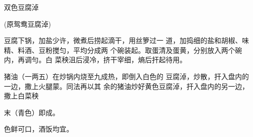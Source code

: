 \begin{recipe}{双色豆腐淖}

(原鸳鸯豆腐淖)

\ingredients


\cooking

\step 	豆腐下锅，加盐少许，微煮后捞起滴干，用丝箩过一 道，加捣细的盐和胡椒、味精、料酒、豆粉搅匀，平均分成两 个碗装起。取蛋清及蛋黄，分别放入两个碗内，再调勻。白 菜秧沮后浸冷，挤干宰细，熵后扞起待用。

\step 	猪油（一两五）在炒锅内烧至九成热，即倒入白色的 豆腐淖，炒散，扞入盘内的一边，撒上火腿蒙。同法再以其 余的猪油炒好黄色豆腐淖，扞入盘内的另一边，撒上白菜秧

末（青色）即成。

\notes

色鲜可口，酒饭均宜。

\end{recipe}

